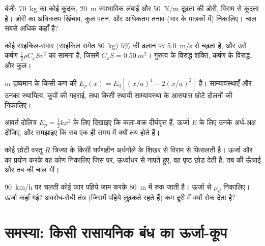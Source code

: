 \begin{exercise}[$\star\star$]\label{exo:b1:work-and-energy:7}
बंजी: \qty{70}{kg} का कोई कूदक, \qty{20}{m} स्वाभाविक लंबाई और
\qty{50}{N/m} दृढ़ता की डोरी, विराम से कूदता है। डोरी का अधिकतम खिंचाव,
कुल पतन, और अधिकतम तनाव (भार के मात्रकों में) निकालिए। चाल सबसे अधिक कहाँ
है?
\end{exercise}

\begin{exercise}[$\star\star$]\label{exo:b1:work-and-energy:8}
कोई साइकिल-सवार (साइकिल समेत \qty{80}{kg}) $5\%$ की ढलान पर \qty{5.0}{m/s}
से चढ़ता है, और उसे कर्षण $\tfrac12\rho C_xSv^2$ का सामना है, जिसमें
$C_xS = \qty{0.50}{m^2}$। गुरुत्व के विरुद्ध शक्ति, कर्षण के विरुद्ध, और कुल।
\end{exercise}

\begin{exercise}[$\star\star$]\label{exo:b1:work-and-energy:9}
$m$ द्रव्यमान के किसी कण की $E_p(x) = E_0[(x/a)^4 - 2(x/a)^2]$ है।
साम्यावस्थाएँ और उनका स्थायित्व, कूपों की गहराई, तथा किसी स्थायी
साम्यावस्था के आसपास छोटे दोलनों की  निकालिए।
\end{exercise}

\begin{exercise}[$\star\star\star$]\label{exo:b1:work-and-energy:10}
आवर्त दोलित्र $E_p = \tfrac12 kx^2$ के लिए दिखाइए कि कला-वक्र दीर्घवृत्त
हैं, ऊर्जा $E$ के लिए उनके अर्ध-अक्ष दीजिए, और समझाइए कि सब एक ही समय में
क्यों तय होते हैं।
\end{exercise}

\begin{exercise}[$\star\star\star$]\label{exo:b1:work-and-energy:11}
कोई छोटी वस्तु $R$ त्रिज्या के किसी घर्षणहीन अर्धगोले के शिखर से विराम से
फिसलती है। ऊर्जा और  का प्रयोग करके वह कोण निकालिए जिस पर,
ऊर्ध्वाधर से नापते हुए, वह पृष्ठ छोड़ देती है; तब की ऊँचाई और तब की चाल भी।
\end{exercise}

\begin{exercise}[$\star\star\star$]\label{exo:b1:work-and-energy:12}
\qty{90}{km/h} पर चलती कोई कार पहिये जाम करके \qty{80}{m} में रुक जाती है।
ऊर्जा से $\mu_d$ निकालिए। ऊर्जा कहाँ गई? अवरोध-रोधी तंत्र (जिसमें पहिये
लुढ़कते रहते हैं) कम दूरी में क्यों रोक देता है?
\end{exercise}

\section{समस्या: किसी रासायनिक बंध का ऊर्जा-कूप}

